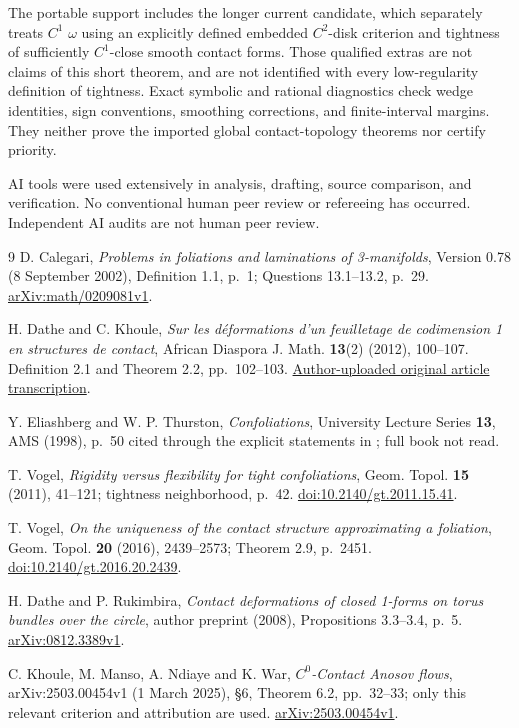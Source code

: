 \documentclass[11pt]{article}
\begin{document}
The portable support includes the longer current candidate, which
separately treats $C^1$ $\omega$ using an explicitly defined embedded
$C^2$-disk criterion and tightness of sufficiently $C^1$-close smooth
contact forms. Those qualified extras are not claims of this short
theorem, and are not identified with every low-regularity definition
of tightness. Exact symbolic and rational diagnostics check wedge
identities, sign conventions, smoothing corrections, and finite-interval
margins. They neither prove the imported global contact-topology
theorems nor certify priority.

AI tools were used extensively in analysis, drafting, source comparison,
and verification. No conventional human peer review or refereeing has
occurred. Independent AI audits are not human peer review.

\clearpage
\begin{thebibliography}{9}\small
{} D. Calegari, \emph{Problems in foliations and laminations
of 3-manifolds}, Version 0.78 (8 September 2002), Definition 1.1,
p.~1; Questions 13.1--13.2, p.~29.
\href{https://arxiv.org/abs/math/0209081v1}{arXiv:math/0209081v1}.

 H. Dathe and C. Khoule, \emph{Sur les d\'eformations
d'un feuilletage de codimension 1 en structures de contact},
African Diaspora J. Math. \textbf{13}(2) (2012), 100--107.
Definition 2.1 and Theorem 2.2, pp.~102--103.
\href{https://www.researchgate.net/publication/258228980_Sur_les_deformations_d\%27un_feuilletage_de_codimension_1_en_structures_de_contact}{Author-uploaded original article transcription}.

 Y. Eliashberg and W. P. Thurston, \emph{Confoliations},
University Lecture Series \textbf{13}, AMS (1998), p.~50 cited through
the explicit statements in \cite{V11,DR}; full book not read.

 T. Vogel, \emph{Rigidity versus flexibility for tight
confoliations}, Geom. Topol. \textbf{15} (2011), 41--121;
tightness neighborhood, p.~42.
\href{https://doi.org/10.2140/gt.2011.15.41}{doi:10.2140/gt.2011.15.41}.

 T. Vogel, \emph{On the uniqueness of the contact structure
approximating a foliation}, Geom. Topol. \textbf{20} (2016), 2439--2573;
Theorem 2.9, p.~2451.
\href{https://doi.org/10.2140/gt.2016.20.2439}{doi:10.2140/gt.2016.20.2439}.

 H. Dathe and P. Rukimbira, \emph{Contact deformations of
closed 1-forms on torus bundles over the circle}, author preprint (2008),
Propositions 3.3--3.4, p.~5.
\href{https://arxiv.org/abs/0812.3389v1}{arXiv:0812.3389v1}.

 C. Khoule, M. Manso, A. Ndiaye and K. War,
\emph{$C^0$-Contact Anosov flows}, arXiv:2503.00454v1 (1 March 2025),
\S6, Theorem 6.2, pp.~32--33; only this relevant criterion and
attribution are used.
\href{https://arxiv.org/abs/2503.00454v1}{arXiv:2503.00454v1}.
\end{thebibliography}
\end{document}

